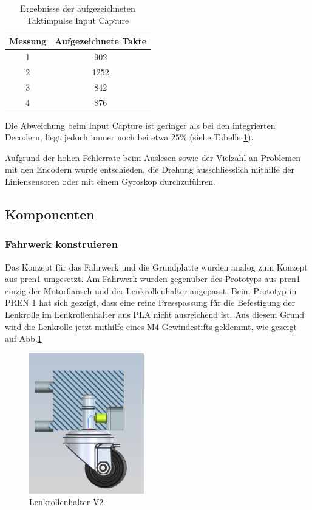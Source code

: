 \begin{table}[ht]
\centering
\caption{Ergebnisse der aufgezeichneten Taktimpulse Input Capture}
\label{tab:taktergebnisse_im}
\begin{tabular}{|c|c|}
\hline
\textbf{Messung} & \textbf{Aufgezeichnete Takte} \\
\hline
1 & 902 \\
2 & 1252 \\
3 & 842 \\
4 & 876 \\
\hline
\end{tabular}
\end{table}

Die Abweichung beim Input Capture ist geringer als bei den integrierten Decodern, liegt jedoch immer noch bei etwa 25\% (siehe Tabelle \ref{tab:taktergebnisse_im}).

Aufgrund der hohen Fehlerrate beim Auslesen sowie der Vielzahl an Problemen mit den Encodern wurde entschieden, die Drehung ausschliesslich mithilfe der Liniensensoren oder mit einem Gyroskop durchzuführen.

\subsection{Komponenten}
\label{Komponenten}

\subsubsection{Fahrwerk konstruieren}
\label{Fahrwerk konstruieren}

 Das Konzept für das Fahrwerk und die Grundplatte wurden analog zum Konzept aus \acrshort{pren1} umgesetzt. Am Fahrwerk wurden gegenüber des Prototyps aus \acrshort{pren1} einzig der Motorflansch und der Lenkrollenhalter angepasst. Beim Prototyp in PREN 1 hat sich gezeigt, dass eine reine Presspassung für die Befestigung der Lenkrolle im Lenkrollenhalter aus PLA nicht ausreichend ist. Aus diesem Grund wird die Lenkrolle jetzt mithilfe eines M4 Gewindestifts geklemmt, wie gezeigt auf Abb.\ref{fig: Lenkrollenhalter V2} 

\begin{figure}[H]
\centering
\includegraphics[width=5cm]{assets/MT/Lenkrollenhalter V2.png}
\caption{Lenkrollenhalter V2}
\label{fig: Lenkrollenhalter V2}
\end{figure}

